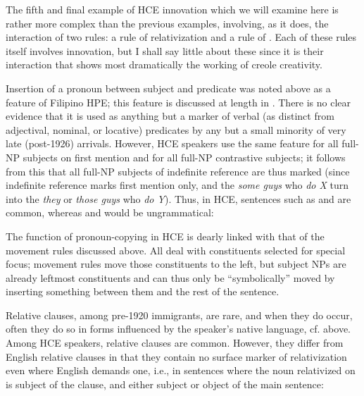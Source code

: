The fifth and final example of HCE innovation which we will examine here is rather more complex than the previous examples, involving, as it does, the interaction of two rules: a rule of relativization and a rule of . Each of these rules itself involves inno\-vation, but I shall say little about these since it is their interaction that shows most dramatically the working of creole creativity.

Insertion of a pronoun between subject and predicate was noted above as a feature of Filipino HPE; this feature is discussed at length in \citet[3.6.1]{BickertonEtAl1976a}. There is no clear evidence that it is used as anything but a marker of verbal (as distinct from adjectival, nominal, or locative) predicates by any but a small minority of very late (post-1926) arrivals. However, HCE speakers use the same feature for all full-NP subjects on first mention and for all full-NP contrastive subjects; it follows from this that all full-NP subjects of indefinite refer\-ence are thus marked (since indefinite reference marks first mention only, and the \textit{some guys} who \textit{do X} turn into the \textit{they} or \textit{those guys} who \textit{do Y}). Thus, in HCE, sentences such as  and  are common, whereas  and  would be ungrammatical:

\z

\z

\z

\z

\noindent The function of pronoun-copying in HCE is dearly linked with that of the movement rules discussed above. All deal with constituents selected for special focus; movement rules move those constituents to the left, but subject NPs are already leftmost constituents and can thus only be ``symbolically'' moved by inserting something between them and the rest of the sentence.

Relative clauses, among pre-1920 immigrants, are rare, and when they do occur, often they do so in forms influenced by the speaker's native language, cf.  above. Among HCE speakers, relative clauses are common. However, they differ from English relative clauses in that they contain no surface marker of relativization even where English demands one, i.e., in sentences where the noun relativized on is sub\-ject of the clause, and either subject  or object  of the main sentence:

